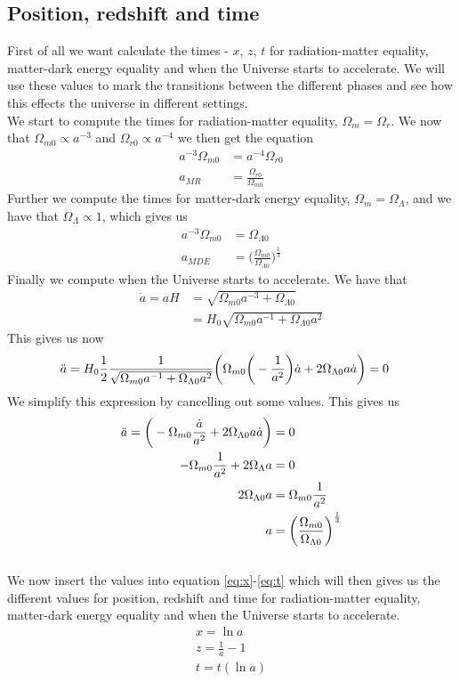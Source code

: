 \documentclass{article}
\begin{document}
\begin{multicols}{2}
\subsection{Position, redshift and time }
First of all we want calculate the times - $x$, $z$, $t$ for radiation-matter equality, matter-dark energy equality and when the Universe starts to accelerate. We will use these values to mark the transitions between the different phases and see how this effects the universe in different settings.\\
We start to compute the times for radiation-matter equality, $\Omega_{m}=\Omega_{r}$. We now that $\Omega_{m0}\propto a^{-3}$ and $\Omega_{r0}\propto a^{-4}$ we then get the equation
\begin{align}
    a^{-3}\Omega_{m0}&=a^{-4}\Omega_{r0}\\
    a_{MR}&=\frac{\Omega_{r0}}{\Omega_{m0}}
\end{align}
Further we compute the times for matter-dark energy equality, $\Omega_{m}=\Omega_{\Lambda}$, and we have that $\Omega_{\Lambda}\propto 1$, which gives us
\begin{align}
    a^{-3}\Omega_{m0}&=\Omega_{\Lambda0}\\
    a_{MDE}&=\bigg(\frac{\Omega_{m0}}{\Omega_{\Lambda0}}\bigg)^{\frac{1}{3}}
\end{align}
Finally we compute when the Universe starts to accelerate. We have that 
\begin{align}
    \Dot{a}=aH&=\sqrt{\Omega_{m0}a^{-3}+\Omega_{\Lambda0}}\\
    &=H_0\sqrt{\Omega_{m0}a^{-1}+\Omega_{\Lambda0} a^2}
\end{align}
This gives us now 
\begin{align}
    \Ddot{a}&=H_0\frac{1}{2}\frac{1}{\sqrt{\Omega_{m0}a^{-1}+\Omega_{\Lambda0} a^2}}\bigg(\Omega_{m0}\bigg(-\frac{1}{a^2}\bigg)\Dot{a}+2\Omega_{\Lambda0} a\Dot{a}\bigg)=0
\end{align}
We simplify this expression by cancelling out some values. This gives us
\begin{align}
    \Ddot{a}=\bigg(-\Omega_{m0}\frac{\Dot{a}}{a^2}+2\Omega_{\Lambda0} a\Dot{a}\bigg)&=0\\
    -\Omega_{m0}\frac{1}{a^2}+2\Omega_\Lambda a&=0\\
    2\Omega_{\Lambda0} a&=\Omega_{m0}\frac{1}{a^2}\\
    a&=\bigg(\frac{\Omega_{m0}}{\Omega_{\Lambda0}}\bigg)^\frac{1}{3}
\end{align}
\\
We now insert the values into equation \eqref{eq:x}-\eqref{eq:t} which will then gives us the different values for position, redshift and time for radiation-matter equality, matter-dark energy equality and when the Universe starts to accelerate.
\begin{align}
    x=\ln{a} \label{eq:x}\\
    z = \frac{1}{a}-1 \label{eq:z}\\
    t=t(\ln{a}) \label{eq:t}
\end{align}

\end{multicols}
\end{document}
